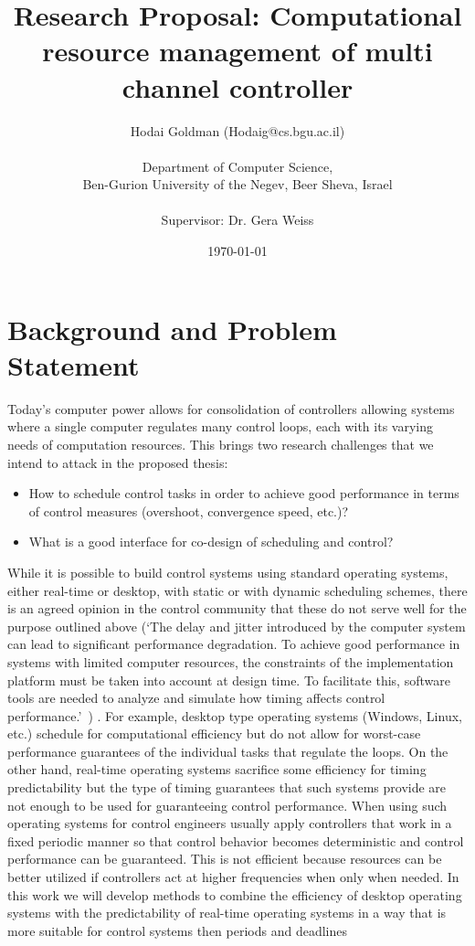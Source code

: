 \documentclass[11pt]{article}
\author{Hodai Goldman (Hodaig@cs.bgu.ac.il) \\ \\Department of Computer Science, \\Ben-Gurion University of the Negev, Beer Sheva, Israel \\ \\Supervisor: Dr. Gera Weiss}
\date{\today}
\title{Research Proposal: Computational resource management of multi channel controller}
\begin{document}
\begin{titlepage}
\maketitle
\end{titlepage}



\section{Background and Problem Statement}
\label{sec:Background}
Today's computer power allows for consolidation of controllers allowing systems where a single computer regulates many control loops, each with its varying needs of computation resources.
This brings two research challenges that we intend to attack in the proposed thesis:
\begin{itemize}
	\item How to schedule control tasks in order to achieve good performance in terms of control measures (overshoot, convergence speed, etc.)?
	\item What is a good interface for co-design of scheduling and control?
\end{itemize}

While it is possible to build control systems using standard operating systems, either real-time or desktop, with static or with dynamic scheduling schemes, there is an agreed opinion in the control community that these do not serve well for the purpose outlined above 
(`The delay and jitter introduced by the computer system can lead to significant performance degradation. To achieve good performance in systems with limited computer resources, the constraints of the implementation platform must be taken into account at design time. To facilitate this, software tools are needed to analyze and simulate how timing affects control performance.'~\cite{Cervin}) 
\cite{RTComposer} \cite{Shlomo} \cite{UPenn-Pant}. 
For example, desktop type operating systems (Windows, Linux, etc.) schedule for computational efficiency but do not allow for worst-case performance guarantees of the individual tasks that regulate the loops. On the other hand, real-time operating systems sacrifice some efficiency for timing predictability but the type of timing guarantees that such systems provide are not enough to be used for guaranteeing control performance. When using such operating systems for control engineers usually apply controllers that work in a fixed periodic manner so that control behavior becomes deterministic and control performance can be guaranteed. This is not efficient because resources can be better utilized if controllers act at higher frequencies when only when needed. 
In this work we will develop methods to combine the efficiency of desktop operating systems with the predictability of real-time operating systems in a way that is more suitable for control systems then periods and deadlines
\end{document}
